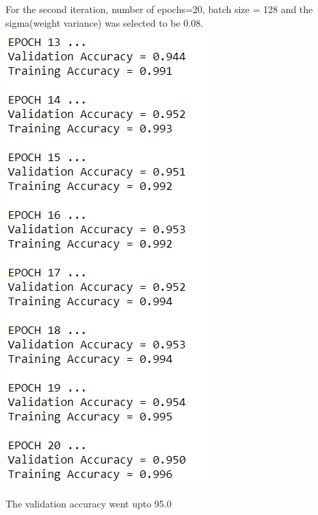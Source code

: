 \documentclass[11pt]{article}
\makeatletter
\def\maxwidth{\ifdim\Gin@nat@width>\linewidth\linewidth
    \else\Gin@nat@width\fi}
\let\Oldincludegraphics\includegraphics
\renewcommand{\includegraphics}[1]{\Oldincludegraphics[width=.8\maxwidth]{#1}}
\makeatother
\begin{document}
For the second iteration, number of epochs=20, batch size = 128 and the
sigma(weight variance) was selected to be 0.08.
\includegraphics{iteration2.PNG}

The validation accuracy went upto 95.0
\end{document}
